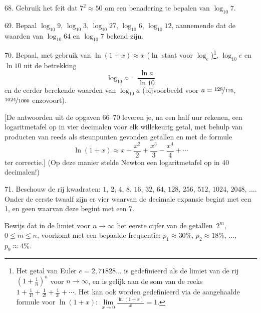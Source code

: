 \begin{problem}{68.}
	Gebruik het feit dat $7^2 \approx 50$ om een benadering te bepalen van $\log_{10} 7$.
\end{problem}

\begin{problem}{69.}
	Bepaal $\log_{10} 9$, $\log_{10} 3$, $\log_{10} 27$, $\log_{10} 6$, $\log_{10} 12$, aannemende dat de waarden van $\log_{10} 64$ en $\log_{10} 7$ bekend zijn.
\end{problem}

\begin{problem}{70.}
	Bepaal, met gebruik van $\ln (1+x) \approx x$ ($\ln$ staat voor $\log_e$)\footnote{Het getal van Euler $e = 2{,}71828\dots$ is gedefinieerd als de limiet van de rij $\left(1+\frac1n\right)^n$ voor $n\to \infty$, en is gelijk aan de som van de reeks $1+\frac 1{1!}+\frac 1{2!}+\frac 1{3!}+\dotsb$. Het kan ook worden gedefinieerd via de aangehaalde formule voor $\ln (1+x)$: $\lim\limits_{x\to 0}\frac{\ln(1+x)}{x} = 1$.}, $\log_{10} e$ en $\ln 10$ uit de betrekking
	\begin{equation*}
		\log_{10} a=\frac{\ln a}{\ln 10}
	\end{equation*}
	en de eerder berekende waarden van $\log_{10} a$ (bijvoorbeeld voor $a = \nicefrac{128}{125}$, $\nicefrac{1024}{1000}$ enzovoort).

	[De antwoorden uit de opgaven 66--70 leveren je, na een half uur rekenen, een logaritmetafel op in vier decimalen voor elk willekeurig getal, met behulp van producten van reeds als steunpunten gevonden getallen en met de formule
	\begin{equation*}
		\ln (1+x) \approx x-\frac{x^2}{2}+\frac{x^3}{3}-\frac{x^4}{4}+\dotsb
	\end{equation*}
	ter correctie.] (Op deze manier stelde Newton een logaritmetafel op in 40 decimalen!)
\end{problem}

\begin{problem}{71.}
	Beschouw de rij kwadraten: $1$, $2$, $4$, $8$, $16$, $32$, $64$, $128$, $256$, $512$, $1024$, $2048$, $\dotsc$. Onder de eerste twaalf zijn er vier waarvan de decimale expansie begint met een 1, en geen waarvan deze begint met een 7.

	Bewijs dat in de limiet voor $n \to \infty$ het eerste cijfer van de getallen~$2^m$, $0 \leqslant m \leqslant n$, voorkomt met een bepaalde frequentie: $p_1 \approx 30\%$, $p_2 \approx 18\%$, $\dotsc$, $p_9 \approx 4\%$.
\end{problem}

